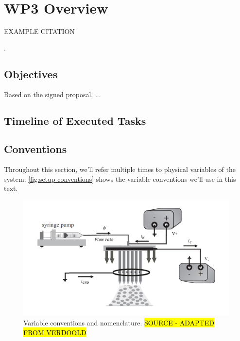 \documentclass[oneside,12pt]{article}
\begin{document}
\setlength{\parindent}{0 em}  %
\setlength{\parskip}{0.7 em}    %

\newpage    \pagestyle{empty}
\tableofcontents
\pagestyle{fancy}
\newpage

\section{WP3 Overview}

EXAMPLE CITATION

 \citep{Carrasco-Munoz2022}. %

\subsection{Objectives}

Based on the signed proposal, ... 

\subsection{Timeline of Executed Tasks}

\subsection{Conventions}

Throughout this section, we'll refer multiple times to physical variables of the system. \autoref{fig:setup-conventions}
shows the variable conventions we'll use in this text.

\begin{figure}[h!]
    \centering
    \includegraphics[width=.9\textwidth,trim=1 1 1 1,clip]{figures/setup-conventions.png}
    \caption{Variable conventions and nomenclature. \hl{SOURCE - ADAPTED FROM VERDOOLD}}
    \label{fig:setup-conventions}
\end{figure}
\end{document}
